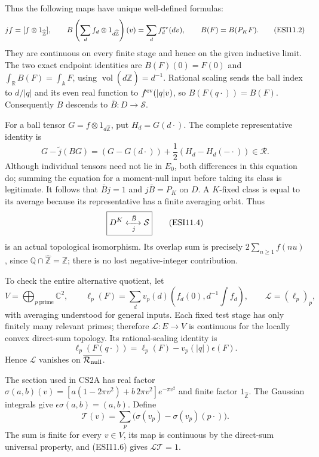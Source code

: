 Thus the following maps have unique well-defined formulas: \[
jf=[f\otimes1_{\widehat{\mathbb Z}}],\qquad
B\left(\sum_d f_d\otimes1_{d\widehat{\mathbb Z}}\right)(v)
=\sum_d f_d^{\rm ev}(dv),\qquad B(F)=B(P_KF).
\tag{ESI11.2}
\] They are continuous on every finite stage and hence on the given
inductive limit. The two exact endpoint identities are \(B(F)(0)=F(0)\)
and \(\int_{\mathbb R}B(F)=\int_{\mathbb A}F\), using
\(\operatorname{vol}(d\widehat{\mathbb Z})=d^{-1}\). Rational scaling
sends the ball index to \(d/|q|\) and its even real function to
\(f^{\rm ev}(|q|v)\), so \(B(F(q\cdot))=B(F)\). Consequently \(B\)
descends to \(\bar B:D\to\mathcal S\).

For a ball tensor \(G=f\otimes1_{d\widehat{\mathbb Z}}\), put
\(H_d=G(d\cdot)\). The complete representative identity is \[
G-\widetilde j(BG)
=(G-G(d\cdot))+\frac12(H_d-H_d(-\cdot))\in\mathcal R.
\tag{ESI11.3}
\] Although individual tensors need not lie in \(E_0\), both differences
in this equation do; summing the equation for a moment-null input before
taking its class is legitimate. It follows that \(\bar Bj=1\) and
\(j\bar B=P_K\) on \(D\). A \(K\)-fixed class is equal to its average
because its representative has a finite averaging orbit. Thus \[
\boxed{D^K\xleftrightarrow[\ j\ ]{\ \bar B\ }\mathcal S}
\tag{ESI11.4}
\] is an actual topological isomorphism. Its overlap sum is precisely
\(2\sum_{n\ge1}f(nu)\), since
\(\mathbb Q\cap\widehat{\mathbb Z}=\mathbb Z\); there is no lost
negative-integer contribution.

To check the entire alternative quotient, let \[
V=\bigoplus_{p\ \mathrm{prime}}\mathbb C^2,
\qquad
\ell_p(F)=\sum_d v_p(d)\left(f_d(0),d^{-1}\int f_d\right),
\qquad \mathscr L=(\ell_p)_p,
\tag{ESI11.5}
\] with averaging understood for general inputs. Each fixed test stage
has only finitely many relevant primes; therefore \(\mathscr L:E\to V\)
is continuous for the locally convex direct-sum topology. Its
rational-scaling identity is \[
\ell_p(F(q\cdot))=\ell_p(F)-v_p(|q|)\epsilon(F).
\tag{ESI11.6}
\] Hence \(\mathscr L\) vanishes on
\(\overline{\mathcal R_{\rm null}}\).

The section used in CS2A has real factor
\(\sigma(a,b)(v)=[a(1-2\pi v^2)+b\,2\pi v^2]e^{-\pi v^2}\) and finite
factor \(1_{\widehat{\mathbb Z}}\). The Gaussian integrals give
\(\epsilon\sigma(a,b)=(a,b)\). Define \[
\mathscr T(v)=\sum_p\bigl(\sigma(v_p)-\sigma(v_p)(p\cdot)\bigr).
\tag{ESI11.7}
\] The sum is finite for every \(v\in V\), its map is continuous by the
direct-sum universal property, and (ESI11.6) gives
\(\mathscr L\mathscr T=1\).

